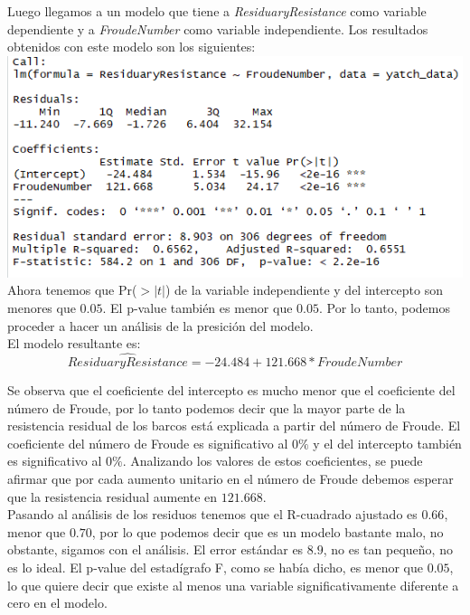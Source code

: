 \documentclass[twoside]{article}
\begin{document}
\begin{multicols}{2}
Luego llegamos a un modelo que tiene a \textit{ResiduaryResistance} como variable dependiente y a \textit{FroudeNumber} como variable independiente. Los resultados obtenidos con este modelo son los siguientes:\\

\includegraphics[scale = 0.4]{images/pic_03.png} \\

Ahora tenemos que Pr($>|t|$) de la variable independiente y del intercepto son menores que $0.05$. El p-value tambi\'en es menor que $0.05$. Por lo tanto, podemos proceder a hacer un an\'alisis de la presici\'on del modelo.\\
El modelo resultante es:
$$\hat{ResiduaryResistance} = -24.484 + 121.668 * FroudeNumber$$

Se observa que el coeficiente del intercepto es mucho menor que el coeficiente del n\'umero de Froude, por lo tanto podemos decir que la mayor parte de la resistencia residual de los barcos est\'a explicada a partir del n\'umero de Froude. El coeficiente del n\'umero de Froude es significativo al $0\%$ y el del intercepto tambi\'en es significativo al $0\%$. Analizando los valores de estos coeficientes, se puede afirmar que por cada aumento unitario en el n\'umero de Froude debemos esperar que la resistencia residual aumente en $121.668$. \\

Pasando al an\'alisis de los residuos tenemos que el R-cuadrado ajustado es $0.66$, menor que $0.70$, por lo que podemos decir que  es un modelo bastante malo, no obstante, sigamos con el an\'alisis. El error est\'andar es $8.9$, no es tan peque\~no, no es lo ideal. El p-value del estad\'igrafo F, como se hab\'ia dicho, es menor que $0.05$, lo que quiere decir que existe al menos una variable significativamente diferente a cero en el modelo.\\


\end{multicols}
\end{document}
